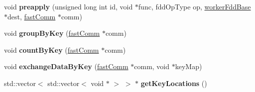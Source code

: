 \begin{DoxyCompactItemize}
\item 
\hypertarget{classfaster_1_1workerIFddCore_a9a20510374fc95015a5c95301a3d7ee7}{}void {\bfseries preapply} (unsigned long int id, void $\ast$func, fdd\+Op\+Type op, \hyperlink{classfaster_1_1workerFddBase}{worker\+Fdd\+Base} $\ast$dest, \hyperlink{classfaster_1_1fastComm}{fast\+Comm} $\ast$comm)\label{classfaster_1_1workerIFddCore_a9a20510374fc95015a5c95301a3d7ee7}

\item 
\hypertarget{classfaster_1_1workerIFddCore_a24fcf2970ad4871bee0ccc1f0ecfca71}{}void {\bfseries group\+By\+Key} (\hyperlink{classfaster_1_1fastComm}{fast\+Comm} $\ast$comm)\label{classfaster_1_1workerIFddCore_a24fcf2970ad4871bee0ccc1f0ecfca71}

\item 
\hypertarget{classfaster_1_1workerIFddCore_a61548cbc82deeee27391b14017498bc9}{}void {\bfseries count\+By\+Key} (\hyperlink{classfaster_1_1fastComm}{fast\+Comm} $\ast$comm)\label{classfaster_1_1workerIFddCore_a61548cbc82deeee27391b14017498bc9}

\item 
\hypertarget{classfaster_1_1workerIFddCore_af9f7f09c8e1a001c676f958f2f353519}{}void {\bfseries exchange\+Data\+By\+Key} (\hyperlink{classfaster_1_1fastComm}{fast\+Comm} $\ast$comm, void $\ast$key\+Map)\label{classfaster_1_1workerIFddCore_af9f7f09c8e1a001c676f958f2f353519}

\item 
\hypertarget{classfaster_1_1workerIFddCore_a9184015edf3f3f8a74a8f4fdd2e27960}{}std\+::vector$<$ std\+::vector$<$ void $\ast$ $>$ $>$ $\ast$ {\bfseries get\+Key\+Locations} ()\label{classfaster_1_1workerIFddCore_a9184015edf3f3f8a74a8f4fdd2e27960}

\end{DoxyCompactItemize}
